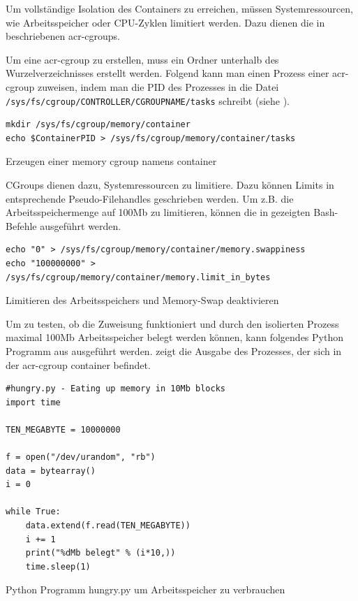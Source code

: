Um vollständige Isolation des Containers zu erreichen, müssen Systemressourcen, wie Arbeitsspeicher oder CPU-Zyklen limitiert werden. Dazu dienen die in  beschriebenen \glspl{acr-cgroup}.

Um eine \gls{acr-cgroup} zu erstellen, muss ein Ordner unterhalb des Wurzelverzeichnisses erstellt werden. Folgend kann man einen Prozess einer \gls{acr-cgroup} zuweisen, indem man die PID des Prozesses in die Datei \texttt{/sys/fs/cgroup/CONTROLLER/CGROUPNAME/tasks} schreibt (siehe ).

\begin{listing}[h]
	\begin{verbatim}
mkdir /sys/fs/cgroup/memory/container
echo $ContainerPID > /sys/fs/cgroup/memory/container/tasks
	\end{verbatim}
	\caption{Erzeugen einer memory cgroup namens container}
	\label{lst:cgroupZuweisen}
\end{listing}

CGroups dienen dazu, Systemressourcen zu limitiere. Dazu können Limits in entsprechende Pseudo-Filehandles geschrieben werden. Um z.B. die Arbeitsspeichermenge auf \tildeawesome100Mb zu limitieren, können die in  gezeigten Bash-Befehle ausgeführt werden. 

\begin{listing}[h]
	\begin{verbatim}
echo "0" > /sys/fs/cgroup/memory/container/memory.swappiness
echo "100000000" > /sys/fs/cgroup/memory/container/memory.limit_in_bytes
	\end{verbatim}
	\caption{Limitieren des Arbeitsspeichers und Memory-Swap deaktivieren}
	\label{lst:limitRam}
\end{listing}

Um zu testen, ob die Zuweisung funktioniert und durch den isolierten Prozess maximal \tildeawesome100Mb Arbeitsspeicher belegt werden können, kann folgendes Python Programm aus  ausgeführt werden.  zeigt die Ausgabe des Prozesses, der sich in der \gls{acr-cgroup} container befindet.

\begin{listing}[hp]
	\begin{verbatim}
#hungry.py - Eating up memory in 10Mb blocks
import time

TEN_MEGABYTE = 10000000

f = open("/dev/urandom", "rb")
data = bytearray()
i = 0

while True:
	data.extend(f.read(TEN_MEGABYTE))
	i += 1
	print("%dMb belegt" % (i*10,))
	time.sleep(1)
	\end{verbatim}
	\caption{Python Programm hungry.py um Arbeitsspeicher zu verbrauchen}
	\label{lst:hungry-py}
\end{listing}


